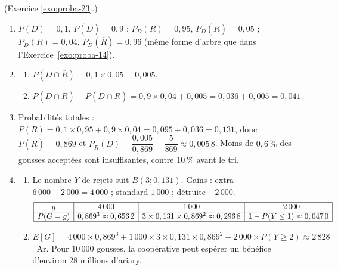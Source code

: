 \begin{corrige}
\begin{sol}
\end{sol}
%
\begin{sol} (Exercice \ref{exo:proba-23}.)
\begin{enumerate}
\item $P(D) = 0,1$, $P(\overline{D}) = 0,9$ ; $P_D(R) = 0,95$, $P_D(\overline{R}) = 0,05$ ; $P_{\overline{D}}(R) = 0,04$, $P_{\overline{D}}(\overline{R}) = 0,96$
      (m\^eme forme d'arbre que dans l'Exercice~\ref{exo:proba-14}).
\item \begin{enumerate}
      \item $P(D\cap\overline{R}) = 0,1\times 0,05 = 0,005$.
      \item $P(\overline{D}\cap R) + P(D\cap\overline{R}) = 0,9\times 0,04 + 0,005 = 0,036 + 0,005 = 0,041$.
      \end{enumerate}
\item Probabilit\'es totales : $P(R) = 0,1\times 0,95 + 0,9\times 0,04 = 0,095 + 0,036 = 0,131$, donc $P(\overline{R}) = 0,869$ et
      $P_{\overline{R}}(D) = \dfrac{0,005}{0,869} = \dfrac{5}{869}\approx 0,005\,8$.
      Moins de $0,6~\%$ des gousses accept\'ees sont insuffisantes, contre $10~\%$ avant le tri.
\item \begin{enumerate}
      \item Le nombre $Y$ de rejets suit $B(3 ; 0,131)$. Gains : extra $6\,000 - 2\,000 = 4\,000$ ; standard $1\,000$ ; d\'etruite $-2\,000$.
            \[
            \begin{array}{|c|c|c|c|}
            \hline
            g & 4\,000 & 1\,000 & -2\,000 \\ \hline
            P(G=g) & 0,869^3\approx 0,656\,2 & 3\times 0,131\times 0,869^2\approx 0,296\,8 & 1 - P(Y\le 1)\approx 0,047\,0 \\ \hline
            \end{array}
            \]
      \item $E[G] = 4\,000\times 0,869^3 + 1\,000\times 3\times 0,131\times 0,869^2 - 2\,000\times P(Y\geq 2)\approx 2\,828$~Ar.
            Pour $10\,000$ gousses, la coop\'erative peut esp\'erer un b\'en\'efice d'environ $28$ millions d'ariary.
      \end{enumerate}
\end{enumerate}
\end{sol}
\end{corrige}
